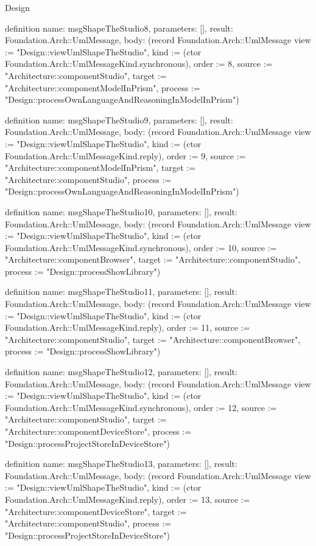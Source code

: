 \begin{lexlean}{Design}
\begin{semanticmodule}
definition{
  name: msgShapeTheStudio8,
  parameters: [],
  result: Foundation.Arch::UmlMessage,
  body: (record Foundation.Arch::UmlMessage {view := "Design::viewUmlShapeTheStudio", kind := (ctor Foundation.Arch::UmlMessageKind.synchronous), order := 8, source := "Architecture::componentStudio", target := "Architecture::componentModelInPrism", process := "Design::processOwnLanguageAndReasoningInModelInPrism"})
}

definition{
  name: msgShapeTheStudio9,
  parameters: [],
  result: Foundation.Arch::UmlMessage,
  body: (record Foundation.Arch::UmlMessage {view := "Design::viewUmlShapeTheStudio", kind := (ctor Foundation.Arch::UmlMessageKind.reply), order := 9, source := "Architecture::componentModelInPrism", target := "Architecture::componentStudio", process := "Design::processOwnLanguageAndReasoningInModelInPrism"})
}

definition{
  name: msgShapeTheStudio10,
  parameters: [],
  result: Foundation.Arch::UmlMessage,
  body: (record Foundation.Arch::UmlMessage {view := "Design::viewUmlShapeTheStudio", kind := (ctor Foundation.Arch::UmlMessageKind.synchronous), order := 10, source := "Architecture::componentBrowser", target := "Architecture::componentStudio", process := "Design::processShowLibrary"})
}

definition{
  name: msgShapeTheStudio11,
  parameters: [],
  result: Foundation.Arch::UmlMessage,
  body: (record Foundation.Arch::UmlMessage {view := "Design::viewUmlShapeTheStudio", kind := (ctor Foundation.Arch::UmlMessageKind.reply), order := 11, source := "Architecture::componentStudio", target := "Architecture::componentBrowser", process := "Design::processShowLibrary"})
}

definition{
  name: msgShapeTheStudio12,
  parameters: [],
  result: Foundation.Arch::UmlMessage,
  body: (record Foundation.Arch::UmlMessage {view := "Design::viewUmlShapeTheStudio", kind := (ctor Foundation.Arch::UmlMessageKind.synchronous), order := 12, source := "Architecture::componentStudio", target := "Architecture::componentDeviceStore", process := "Design::processProjectStoreInDeviceStore"})
}

definition{
  name: msgShapeTheStudio13,
  parameters: [],
  result: Foundation.Arch::UmlMessage,
  body: (record Foundation.Arch::UmlMessage {view := "Design::viewUmlShapeTheStudio", kind := (ctor Foundation.Arch::UmlMessageKind.reply), order := 13, source := "Architecture::componentDeviceStore", target := "Architecture::componentStudio", process := "Design::processProjectStoreInDeviceStore"})
}


\end{semanticmodule}
\end{lexlean}
